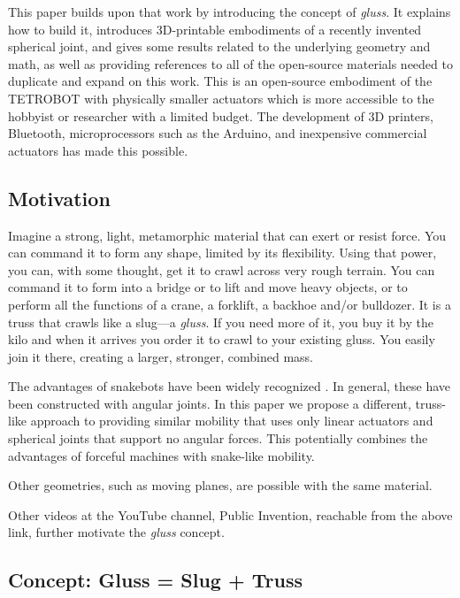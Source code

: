 \documentclass[11pt]{article}
\begin{document}
This paper builds upon that work by introducing the concept of \emph{gluss}. It explains how to build it,
introduces 3D-printable embodiments of
a recently invented spherical joint\cite{song2003spherical}, 
and gives some results related to the underlying geometry and math, as well as providing
references to all of the open-source materials needed to duplicate and expand on this work. This is an
open-source embodiment of the TETROBOT with physically smaller actuators which is more accessible to the
hobbyist or researcher with a limited budget.  The development of 3D printers, Bluetooth, microprocessors
such as the Arduino, and inexpensive commercial actuators has made this possible.

\subsection{Motivation}

Imagine a strong, light, metamorphic material that can exert or resist force.
You can command it to form any shape, limited by its flexibility.
Using that power, you can, with some thought, get it to crawl across very rough terrain.
You can command it to form into a bridge or to lift and move heavy objects,
or to perform all the functions of a crane, a forklift, a backhoe and/or bulldozer.
It is a truss that crawls like a slug---a \emph{gluss}.
If you need more of it, you buy it by the kilo and when it arrives you order it
to crawl to your existing gluss. You easily join it there, creating a
larger, stronger, combined mass.

The advantages of snakebots have been widely recognized \cite{liljebäck2012snake}. In general, these have been constructed
with angular joints. In this paper we propose a different, truss-like approach to providing similar
mobility that uses only linear actuators and spherical joints that support no angular forces. This
potentially combines the advantages of forceful machines with snake-like mobility.

Other geometries, such as moving planes, are possible with the same material.

Other videos at the YouTube channel, Public Invention, reachable from the above link,
further motivate the \emph{gluss} concept.


\subsection{Concept: Gluss = Slug + Truss}
\end{document}
